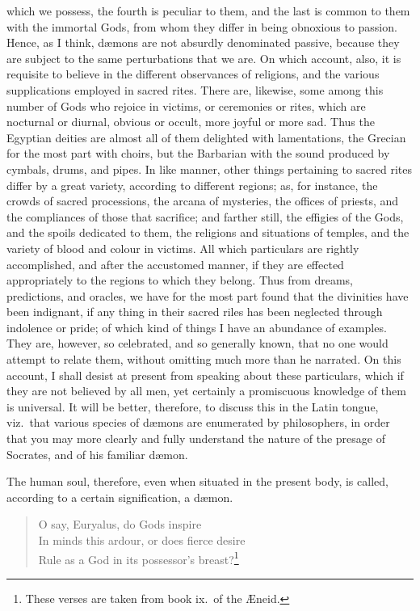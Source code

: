 \documentclass[12pt]{article}
\begin{document}
which we possess, the fourth is peculiar to them, and the last is common to
them with the immortal Gods, from whom they differ in being obnoxious to
passion. Hence, as I think, d{\ae}mons are not absurdly denominated passive,
because they are subject to the same perturbations that we are. On which
account, also, it is requisite to believe in the different observances of
religions, and the various supplications employed in sacred rites. There are,
likewise, some among this number of Gods who rejoice in victims, or ceremonies
or rites, which are nocturnal or diurnal, obvious or occult, more joyful or
more sad. Thus the Egyptian deities are almost all of them delighted with
lamentations, the Grecian for the most part with choirs, but the Barbarian with
the sound produced by cymbals, drums, and pipes. In like manner, other things
pertaining to sacred rites differ by a great variety, according to different
regions; as, for instance, the crowds of sacred processions, the arcana of
mysteries, the offices of priests, and the compliances of those that sacrifice;
and farther still, the effigies of the Gods, and the spoils dedicated to them,
the religions and situations of temples, and the variety of blood and colour in
victims. All which particulars are rightly accomplished, and after the
accustomed manner, if they are effected appropriately to the regions to which
they belong. Thus from dreams, predictions, and oracles, we have for the most
part found that the divinities have been indignant, if any thing in their
sacred riles has been neglected through indolence or pride; of which kind of
things I have an abundance of examples. They are, however, so celebrated, and
so generally known, that no one would attempt to relate them, without omitting
much more than he narrated.  On this account, I shall desist at present from
speaking about these particulars, which if they are not believed by all men,
yet certainly a promiscuous knowledge of them is universal. It will be better,
therefore, to discuss this in the Latin tongue, viz.~that various species of
d{\ae}mons are enumerated by philosophers, in order that you may more clearly
and fully understand the nature of the presage of Socrates, and of his familiar
d{\ae}mon.

The human soul, therefore, even when situated in the present body, is called,
according to a certain signification, a d{\ae}mon.

\begin{verse}
O say, Euryalus, do Gods inspire\\
In minds this ardour, or does fierce desire\\
Rule as a God in its possessor's breast?\footnote{These verses are taken from
book ix.~of the {\AE}neid.}
\end{verse}
\end{document}
